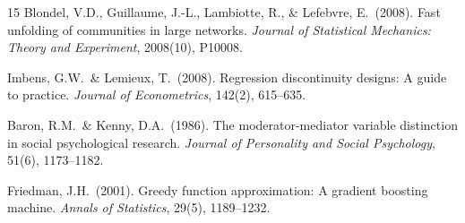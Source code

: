 \documentclass{article}
\begin{document}
\begin{thebibliography}{15}
Blondel, V.D., Guillaume, J.-L., Lambiotte, R., \& Lefebvre, E.\ (2008).
Fast unfolding of communities in large networks.
\textit{Journal of Statistical Mechanics: Theory and Experiment}, 2008(10), P10008.

Imbens, G.W.\ \& Lemieux, T.\ (2008).
Regression discontinuity designs: A guide to practice.
\textit{Journal of Econometrics}, 142(2), 615--635.

Baron, R.M.\ \& Kenny, D.A.\ (1986).
The moderator-mediator variable distinction in social psychological research.
\textit{Journal of Personality and Social Psychology}, 51(6), 1173--1182.

Friedman, J.H.\ (2001).
Greedy function approximation: A gradient boosting machine.
\textit{Annals of Statistics}, 29(5), 1189--1232.

\end{thebibliography}
\end{document}
